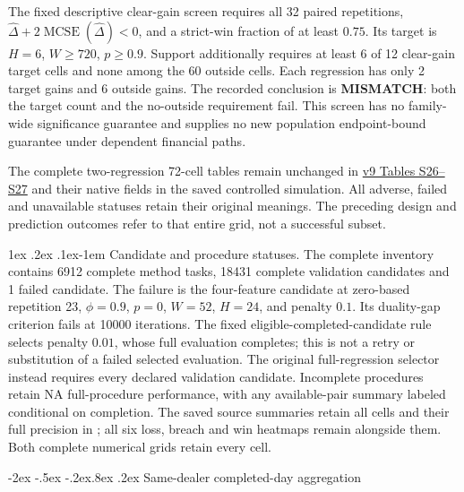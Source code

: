 \documentclass[10pt,a4paper]{article}
\makeatletter
\renewcommand\section{\@startsection{section}{1}{\z@}%
  {-2ex \@plus -.5ex \@minus -.2ex}{.8ex \@plus .2ex}%
  {\normalfont\large\bfseries}}
\renewcommand\paragraph{\@startsection{paragraph}{4}{\z@}%
  {1ex \@plus .2ex \@minus .1ex}{-1em}%
  {\normalfont\normalsize\bfseries}}
\makeatother
\begin{document}
The fixed descriptive clear-gain screen requires all 32 paired repetitions,
\(\widehat\Delta+2\operatorname{MCSE}(\widehat\Delta)<0\), and a strict-win fraction of at least \(0.75\). Its target is \(H=6\), \(W\ge 720\),
\(p\ge 0.9\). Support additionally requires at least 6 of 12
clear-gain target cells and none among the 60 outside cells. Each regression
has only 2 target gains and 6 outside gains. The recorded conclusion
is \textbf{MISMATCH}: both the target count and the no-outside requirement fail.
This screen has no family-wide significance guarantee and supplies no new
population endpoint-bound guarantee under dependent financial paths.

\begingroup
\renewcommand{\footnotesize}{\fontsize{9}{10.5}\selectfont}
The complete two-regression 72-cell tables remain unchanged in \href{https://github.com/ByronLi0207/financial-mathematics-paper-20261020/blob/0d2526cc69092c5158437a0509613bac5e86d47f/submission-jof/supplement.pdf}{v9 Tables S26--S27} and their native fields in the saved controlled simulation. All adverse, failed and unavailable statuses retain their original meanings. The preceding design and prediction outcomes refer to that entire grid, not a successful subset.
\endgroup

\paragraph{Candidate and procedure statuses.}
The complete inventory contains 6912 complete method tasks, 18431 complete
validation candidates and 1 failed candidate. The failure is the four-feature
candidate at zero-based repetition 23, \(\phi=0.9\), \(p=0\), \(W=52\),
\(H=24\), and penalty \(0.1\). Its duality-gap criterion fails at 10000
iterations. The fixed eligible-completed-candidate rule selects penalty
\(0.01\), whose full evaluation completes; this is not a retry or substitution
of a failed selected evaluation. The original full-regression selector instead
requires every declared validation candidate. Incomplete procedures retain NA
full-procedure performance, with any available-pair summary labeled conditional
on completion. The saved source summaries retain all cells and their full
precision in ; all six loss, breach and
win heatmaps remain alongside them. Both complete numerical grids retain every cell.



\section{Same-dealer completed-day aggregation}\label{sup:v8-daily}
\end{document}
